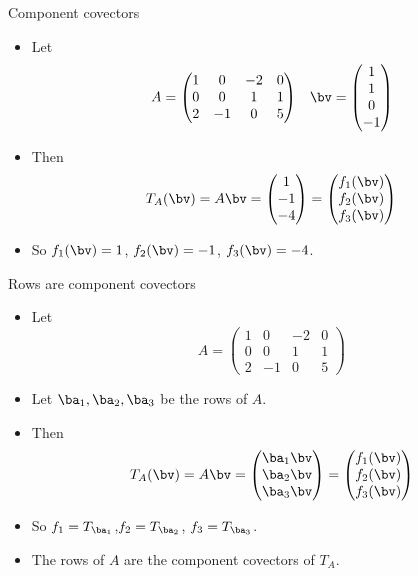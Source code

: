 \documentclass{beamer}
\begin{document}

\begin{frame}{Component covectors}
\begin{itemize}
\item Let
$$
\begin{matrix}
A =
\begin{pmatrix}
1 &  0 & -2 & 0 \\
0 &  0 &  1 & 1 \\
2 & -1 &  0 & 5
\end{pmatrix}
&
\bv =
\begin{pmatrix}
1 \\ 1 \\ 0 \\ -1
\end{pmatrix}
\end{matrix}
$$
\item Then
$$
T_A(\bv) =
A \bv
=
\begin{pmatrix}
1 \\ -1 \\ -4
\end{pmatrix}
=
\begin{pmatrix}
f_1(\bv) \\ f_2(\bv) \\ f_3(\bv)
\end{pmatrix}
$$
\item So $f_1(\bv) = 1$, $f_2(\bv) = -1$, $f_3(\bv) = -4$.
\end{itemize}
\end{frame}


\begin{frame}{Rows are component covectors}
\begin{itemize}
\item Let
$$A =
\begin{pmatrix}
1 &  0 & -2 & 0 \\
0 &  0 &  1 & 1 \\
2 & -1 &  0 & 5
\end{pmatrix}
$$
\item Let $\ba_1, \ba_2, \ba_3$ be the rows of $A$.
\item Then
$$T_A(\bv) =
A \bv
=
\begin{pmatrix}
\ba_1 \bv \\ \ba_2 \bv \\ \ba_3 \bv
\end{pmatrix}
=
\begin{pmatrix}
f_1(\bv) \\ f_2(\bv) \\ f_3(\bv)
\end{pmatrix}
$$
\item So $f_1 = T_{\ba_1}$,$f_2 = T_{\ba_2}$, $f_3 = T_{\ba_3}$.
\item The rows of $A$ are the component covectors of $T_A$.
\end{itemize}
\end{frame}
\end{document}
